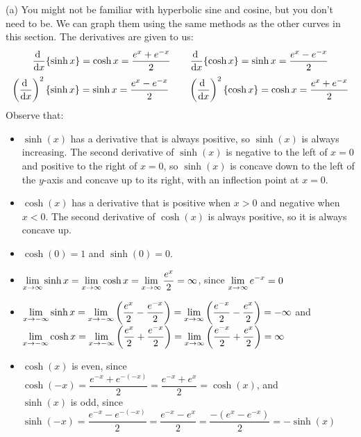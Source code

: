 \begin{solution}

 (a)
 You might not be familiar with hyperbolic sine and cosine, but you don't need to be. We can graph them using  the same methods as the other curves in this section. The derivatives are given to us:
 \[\diff{}{x}\{\sinh x\}=\cosh x =\frac{e^x+e^{-x}}{2}\qquad\diff{}{x}\{\cosh x\}=\sinh x = \frac{e^x-e^{-x}}{2}\]
 \[\left(\diff{}{x}\right)^2\{\sinh x\}=\sinh x =\frac{e^x-e^{-x}}{2}\qquad
 \left(\diff{}{x}\right)^2\{\cosh x\}=\cosh x = \frac{e^x+e^{-x}}{2}\]
  Observe that:
 \begin{itemize}
 \item $\sinh(x)$ has a derivative that is always positive, so $\sinh(x)$ is always increasing. The second derivative of $\sinh(x)$ is negative to the left of $x=0$ and positive to the right of $x=0$, so $\sinh(x)$ is concave down to the left of the $y$-axis and concave up to its right, with an inflection point at $x=0$.
  \item $\cosh(x)$ has a derivative that is positive when $x>0$ and negative when $x<0$. The second derivative of $\cosh(x)$ is always positive, so it is always concave up.
\item $\cosh(0)=1$ and $\sinh(0)=0$.
\item
 $\displaystyle\lim_{x\rightarrow\infty}\sinh x = \displaystyle\lim_{x\rightarrow\infty}\cosh x
 =\displaystyle\lim_{x\rightarrow\infty}\frac{e^x}{2}=\infty$, since $\displaystyle\lim_{x \to \infty}e^{-x}=0$
\item
$\displaystyle\lim_{x \to -\infty}\sinh x =\displaystyle\lim_{x \to -\infty}\left(\frac{e^x}{2}-\frac{e^{-x}}{2}\right)
=\displaystyle\lim_{x \to \infty}\left(\frac{e^{-x}}{2}-\frac{e^x}{2}\right)=-\infty
$ and\\
$\displaystyle\lim_{x \to -\infty}\cosh x =\displaystyle\lim_{x \to -\infty}\left(\frac{e^x}{2}+\frac{e^{-x}}{2}\right)
=\displaystyle\lim_{x \to \infty}\left(\frac{e^{-x}}{2}+\frac{e^x}{2}\right)=\infty
$
\item $\cosh(x)$ is even, since $\cosh(-x)=\dfrac{e^{-x}+e^{-(-x)}}{2}=\dfrac{e^{-x}+e^x}{2}=\cosh (x)$, and\\
$\sinh (x)$ is odd, since $\sinh(-x)=\dfrac{e^{-x}-e^{-(-x)}}{2}=\dfrac{e^{-x}-e^x}{2}=\dfrac{-\left(e^x-e^{-x}\right)}{2}=-\sinh(x)$
\end{itemize}

\begin{center}
\end{center}



\end{solution}

